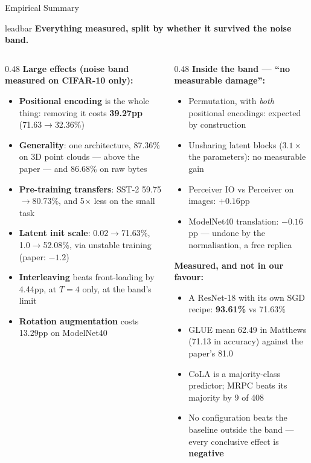 \documentclass[aspectratio=169,11pt]{beamer}
\newcommand{\lead}[1]{%
  \begin{beamercolorbox}[wd=\textwidth,sep=5pt,center]{leadbar}%
    \small\bfseries #1%
  \end{beamercolorbox}\vspace{0.6em}}
\begin{document}
\begin{frame}[shrink=29]{Empirical Summary}
  \lead{Everything measured, split by whether it survived the noise band.}
  \begin{columns}[T]
    \begin{column}{0.48\textwidth}
      \textbf{Large effects (noise band measured on CIFAR-10 only):}
      \begin{itemize}\small
        \item \textbf{Positional encoding} is the whole thing: removing it costs \textbf{39.27pp} (71.63$\to$32.36\%)
        \item \textbf{Generality}: one architecture, 87.36\% on 3D point clouds --- above the paper --- and 86.68\% on raw bytes
        \item \textbf{Pre-training transfers}: SST-2 59.75$\to$80.73\%, and 5$\times$ less on the small task
        \item \textbf{Latent init scale}: 0.02$\to$71.63\%, 1.0$\to$52.08\%, via unstable training (paper: $-1.2$)
        \item \textbf{Interleaving} beats front-loading by 4.44pp, at $T=4$ only, at the band's limit
        \item \textbf{Rotation augmentation} costs 13.29pp on ModelNet40
      \end{itemize}
    \end{column}
    \begin{column}{0.48\textwidth}
      \textbf{Inside the band --- ``no measurable damage'':}
      \begin{itemize}\small
        \item Permutation, with \emph{both} positional encodings: expected by construction
        \item Unsharing latent blocks ($3.1\times$ the parameters): no measurable gain
        \item Perceiver IO vs Perceiver on images: $+0.16$pp
        \item ModelNet40 translation: $-0.16$pp --- undone by the normalisation, a free replica
      \end{itemize}

      \vspace{0.4em}
      \textbf{Measured, and not in our favour:}
      \begin{itemize}\small
        \item A ResNet-18 with its own SGD recipe: \textbf{93.61\%} vs 71.63\%
        \item GLUE mean 62.49 in Matthews (71.13 in accuracy) against the paper's 81.0
        \item CoLA is a majority-class predictor; MRPC beats its majority by 9 of 408
        \item No configuration beats the baseline outside the band --- every conclusive effect is \textbf{negative}
      \end{itemize}
    \end{column}
  \end{columns}


\end{frame}
\end{document}
